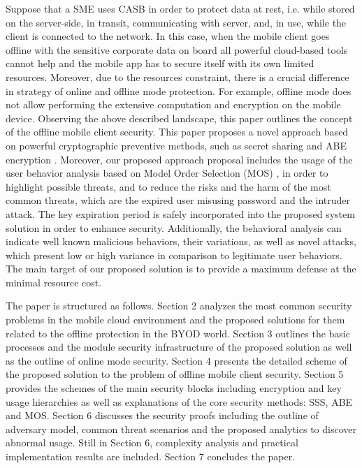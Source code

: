 \documentclass[twocolumn]{svjour3}          	%
\begin{document}
Suppose that a SME uses CASB in order to protect data at rest, i.e. while stored on the server-side, in transit, communicating with server, and, in use, while the client is connected to the network. In this case, when the mobile client goes offline with the sensitive corporate data on board all powerful cloud-based tools cannot help and the mobile app has to secure itself with its own limited resources. Moreover, due to the resources constraint, there is a crucial difference in strategy of online and offline mode protection. For example, offline mode does not allow performing the extensive computation and encryption on the mobile device.
Observing the above described landscape, this paper outlines the concept of the offline mobile client security. This paper proposes a novel approach based on powerful cryptographic preventive methods, such as secret sharing \cite{galibus2007} and ABE encryption \cite{goyal2006attribute}. Moreover, our proposed approach proposal includes the usage of the user behavior analysis based on Model Order Selection (MOS) \cite{tenorio2013greatest}, in order to highlight possible threats, and to reduce the risks and the harm of the most common threats, which are the expired user misusing password and the intruder attack. The key expiration period is safely incorporated into the proposed system solution in order to enhance security. Additionally, the behavioral analysis can indicate well known malicious behaviors, their variations, as well as novel attacks, which present low or high variance in comparison to legitimate user behaviors. The main target of our proposed solution is to provide a maximum defense at the minimal resource cost.

The paper is structured as follows. Section 2 analyzes the most common security problems in the mobile cloud environment and the proposed solutions for them related to the offline protection in the BYOD world. Section 3 outlines the basic processes and the module security infrastructure of the proposed solution as well as the outline of online mode security. Section 4 presents the detailed scheme of the proposed solution to the problem of offline mobile client security. Section 5 provides the schemes of the main security blocks including encryption and key usage hierarchies as well as explanations of the core security methods: SSS, ABE and MOS. Section 6 discusses the security proofs including the outline of adversary model, common threat scenarios and the proposed analytics to discover abnormal usage. Still in Section 6, complexity analysis and practical implementation results are included. Section 7 concludes the paper.
\end{document}
